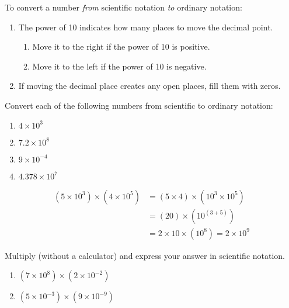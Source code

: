 \documentclass[12pt]{article}
\begin{document}
To convert a number \textit{from} scientific notation \textit{to} ordinary notation:
\begin{enumerate}
\item The power of 10 indicates how many places to move the decimal point.
\begin{enumerate}
\item Move it to the right if the power of 10 is positive.
\item Move it to the left if the power of 10 is negative.
\end{enumerate}
\item If moving the decimal place creates any open places, fill them with zeros.
\end{enumerate}

Convert each of the following numbers from scientific to ordinary notation: 
\begin{enumerate}
\item $4 \times 10^3$
\item $7.2 \times 10^8$
\item $9 \times 10^{-4}$
\item $4.378 \times 10^7$
\end{enumerate}
\vspace{0.25in}


\begin{equation}
\begin{split}
(5 \times 10^3)\times (4\times 10^5) &= (5\times 4) \times (10^3 \times 10^5) \\
&= (20) \times (10^{(3+5)}) \\
&= 2 \times 10 \times (10^8) = 2 \times 10^9
\end{split}
\end{equation}
\vspace{0.5in}


Multiply (without a calculator) and express your answer in scientific notation.
\begin{enumerate}
\item $(7 \times 10^8)\times (2\times 10^{-2})$
\vspace{0.5in}
\item $(5 \times 10^{-3})\times (9\times 10^{-9})$ 
\end{enumerate}
\vspace{0.5in}
\end{document}
